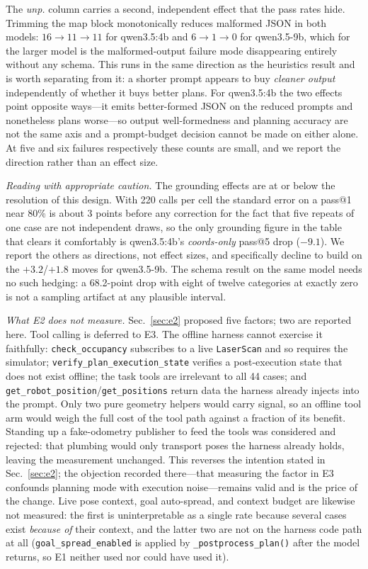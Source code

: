 \documentclass[10pt,twocolumn]{article}
\newcommand{\code}[1]{\texttt{\small #1}}
\begin{document}
The \emph{unp.} column carries a second, independent effect that the pass rates
hide. Trimming the map block monotonically reduces malformed JSON in both
models: $16\to11\to11$ for qwen3.5:4b and $6\to1\to0$ for qwen3.5-9b, which for
the larger model is the malformed-output failure mode disappearing entirely
without any schema. This runs in the same direction as the heuristics result
and is worth separating from it: a shorter prompt appears to buy \emph{cleaner
output} independently of whether it buys better plans. For qwen3.5:4b the two
effects point opposite ways---it emits better-formed JSON on the reduced
prompts and nonetheless plans worse---so output well-formedness and planning
accuracy are not the same axis and a prompt-budget decision cannot be made on
either alone. At five and six failures respectively these counts are small,
and we report the direction rather than an effect size.

\emph{Reading with appropriate caution.} The grounding effects are at or below
the resolution of this design. With 220 calls per cell the standard error on a
pass@1 near 80\% is about 3 points before any correction for the fact that
five repeats of one case are not independent draws, so the only grounding
figure in the table that clears it comfortably is qwen3.5:4b's
\emph{coords-only} pass@5 drop ($-9.1$). We report the others as directions,
not effect sizes, and specifically decline to build on the $+3.2$/$+1.8$ moves
for qwen3.5-9b. The schema result on the same model needs no such hedging: a
68.2-point drop with eight of twelve categories at exactly zero is not a
sampling artifact at any plausible interval.

\emph{What E2 does not measure.} Sec.~\ref{sec:e2} proposed five factors; two
are reported here. Tool calling is deferred to E3.
The offline harness cannot exercise it faithfully: \code{check\_occupancy}
subscribes to a live \code{LaserScan} and so requires the simulator;
\code{verify\_plan\_execution\_state} verifies a post-execution state that
does not exist offline; the task tools are irrelevant to all 44 cases; and
\code{get\_robot\_position}/\code{get\_positions} return data the harness
already injects into the prompt. Only two pure geometry helpers would carry
signal, so an offline tool arm would weigh the full cost of the tool path
against a fraction of its benefit. Standing up a fake-odometry publisher to
feed the tools was considered and rejected: that plumbing would only
transport poses the harness already holds, leaving the measurement
unchanged. This reverses the intention stated in Sec.~\ref{sec:e2}; the
objection recorded there---that measuring the factor in E3 confounds planning
mode with execution noise---remains valid and is the price of the change.
Live pose context, goal auto-spread, and context budget are likewise not
measured: the first is uninterpretable as a single rate because several cases
exist \emph{because of} their context, and the latter two are not on the
harness code path at all (\code{goal\_spread\_enabled} is applied by
\code{\_postprocess\_plan()} after the model returns, so E1 neither used nor
could have used it).
\end{document}
